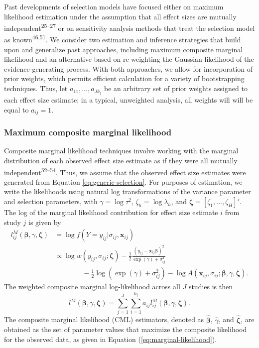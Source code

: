 \documentclass[
  man, donotrepeattitle,floatsintext]{apa7}
\begin{document}
Past developments of selection models have focused either on maximum likelihood estimation under the assumption that all effect sizes are mutually independent\textsuperscript{25--27} or on sensitivity analysis methods that treat the selection model as known\textsuperscript{46,51}. We consider two estimation and inference strategies that build upon and generalize past approaches, including maximum composite marginal likelihood and an alternative based on re-weighting the Gaussian likelihood of the evidence-generating process.
With both approaches, we allow for incorporation of prior weights, which permits efficient calculation for a variety of bootstrapping techniques.
Thus, let \(a_{11},...,a_{J k_j}\) be an arbitrary set of prior weights assigned to each effect size estimate; in a typical, unweighted analysis, all weights will will be equal to \(a_{ij} = 1\).

\subsubsection{Maximum composite marginal likelihood}\label{maximum-composite-marginal-likelihood}

Composite marginal likelihood techniques involve working with the marginal distribution of each observed effect size estimate as if they were all mutually independent\textsuperscript{52--54}.
Thus, we assume that the observed effect size estimates were generated from Equation \eqref{eq:generic-selection}.
For purposes of estimation, we write the likelihoods using natural log transformations of the variance parameter and selection parameters, with \(\gamma = \log \tau^2\), \(\zeta_h = \log \lambda_h\), and \(\boldsymbol\zeta = \left[\zeta_1,...,\zeta_H\right]'\).
The log of the marginal likelihood contribution for effect size estimate \(i\) from study \(j\) is given by
\begin{align}
l^M_{ij}\left(\boldsymbol\beta, \gamma, \boldsymbol\zeta \right) &= \log f\left(Y = y_{ij} | \sigma_{ij}, \mathbf{x}_{ij}\right) \nonumber \\
&\propto \log w\left(y_{ij}, \sigma_{ij}; \boldsymbol\zeta \right) - \frac{1}{2} \frac{\left(y_{ij} - \mathbf{x}_{ij} \boldsymbol\beta\right)^2}{\exp(\gamma) + \sigma_{ij}^2} \nonumber\\
& \qquad \qquad  - \frac{1}{2}\log\left(\exp(\gamma) + \sigma_{ij}^2\right) - \log A\left(\mathbf{x}_{ij}, \sigma_{ij}; \boldsymbol\beta, \gamma, \boldsymbol\zeta \right). \label{eq:log-like-ij}
\end{align}
The weighted composite marginal log-likelihood across all \(J\) studies is then
\begin{equation}
\label{eq:marginal-likelihood}
l^M\left(\boldsymbol\beta, \gamma, \boldsymbol\zeta\right) = \sum_{j=1}^J \sum_{i=1}^{k_j} a_{ij} l^M_{ij}\left(\boldsymbol\beta, \gamma, \boldsymbol\zeta\right).
\end{equation}
The composite marginal likelihood (CML) estimators, denoted as \(\boldsymbol{\hat\beta}\), \(\hat\gamma\), and \(\boldsymbol{\hat\zeta}\), are obtained as the set of parameter values that maximize the composite likelihood for the observed data, as given in Equation (\ref{eq:marginal-likelihood}).
\end{document}
